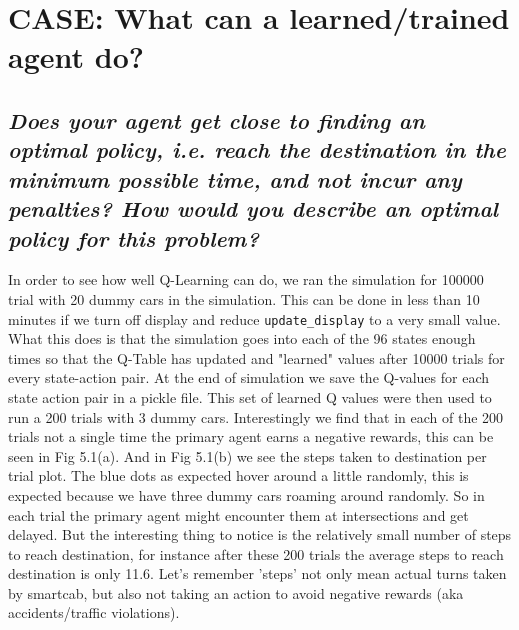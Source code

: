 \documentclass[paper=a4, fontsize=11pt]{scrartcl}
\numberwithin{equation}{section}		%
\numberwithin{figure}{section}			%
\numberwithin{table}{section}				%
\begin{document}
 \pagebreak
\section{CASE: What can a learned/trained agent do?}



\subsection{\textit{Does your agent get close to finding an optimal policy, i.e. reach the destination in the minimum possible time, and not incur any penalties? How would you describe an optimal policy for this problem?}}


In order to see how well Q-Learning can do, we ran the simulation for 100000 trial with 20 dummy cars in the simulation. This can be done in less than 10 minutes if we turn off display and reduce \texttt{update\_display} to a very small value. What this does is that the simulation goes into each of the 96 states enough times so that the Q-Table has updated and "learned" values after 10000 trials for every state-action pair. At the end of simulation we save the Q-values for each state action pair in a pickle file. This set of learned Q values were then used to run a 200 trials with 3 dummy cars. Interestingly we find that in each of the 200 trials not a single time the primary agent earns a negative rewards, this can be seen in Fig 5.1(a). And in Fig 5.1(b) we see the steps taken to destination per trial plot. The blue dots as expected hover around a little randomly, this is expected because we have three dummy cars roaming around randomly. So in each trial the primary agent might encounter them at intersections and get delayed. But the interesting thing to notice is the relatively small number of steps to reach destination, for instance after these 200 trials the average steps to reach destination is only 11.6. Let's remember 'steps' not only mean actual turns taken by smartcab, but also not taking an action to avoid negative rewards (aka accidents/traffic violations).
\end{document}
